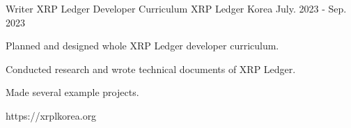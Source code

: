 


\begin{cventries}


\cventry
{Writer} %
{XRP Ledger Developer Curriculum} %
{XRP Ledger Korea} %
{July. 2023 - Sep. 2023} %
{ %
\begin{cvitems}
\item {Planned and designed whole XRP Ledger developer curriculum.}
\item {Conducted research and wrote technical documents of XRP Ledger.}
\item {Made several example projects.}
\item {https://xrplkorea.org}
\end{cvitems}
}


\end{cventries}